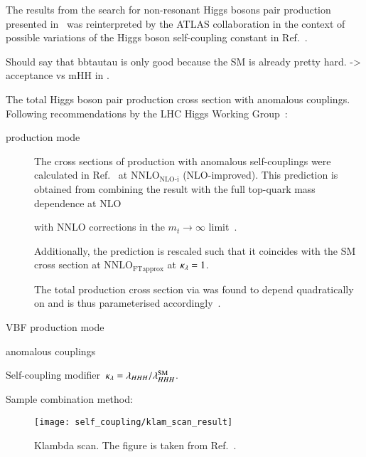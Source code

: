 The results from the search for non-resonant Higgs bosons pair
production presented in~ was reinterpreted by the
ATLAS collaboration in the context of possible variations of the Higgs
boson self-coupling constant \lambdahhh in
Ref.~\cite{ATLAS-CONF-2021-052}.

Should say that bbtautau is only good because the SM is already pretty
hard. -> acceptance vs mHH in \hadhad.

The total Higgs boson pair production cross section with anomalous
couplings. Following recommendations by the LHC Higgs Working
Group~\cite{LHCHWGHH}:
\begin{description}

\item[\ggF production mode] The cross sections of \HH production with
  anomalous self-couplings were calculated in
  Ref.~\cite{Amoroso:2020lgh} at $\text{NNLO}_{\text{NLO-i}}$
  (NLO-improved). This prediction is obtained from combining the
  result with the full top-quark mass dependence at
  NLO~\cite{Buchalla:2018yce}


  with NNLO corrections in the $m_{t} \to \infty$
  limit~\cite{deFlorian:2017qfk}.

  Additionally, the prediction is rescaled such that it coincides with
  the SM \HH cross section at $\text{NNLO}_{\text{FTapprox}}$ at
  $\kappa_{\lambda} = 1$.

  The total \HH production cross section via \ggF was found to depend
  quadratically on \klambda and is thus parameterised
  accordingly~\cite{LHCHWGHH}.

\item[VBF production mode]

\end{description}


anomalous couplings

Self-coupling modifier~$\kappa_{\lambda} = \lambda_{HHH} / \lambda_{HHH}^{\text{SM}}$.


Sample combination method:~\cite{ATL-PHYS-PUB-2019-007}






\begin{figure}[htbp]
  \centering

  \texttt{[image: self\_coupling/klam\_scan\_result]}

  \caption{Klambda scan. The figure is taken from
    Ref.~\cite{ATLAS-CONF-2021-052}.}%
  \label{fig:klambda_scan}
\end{figure}




